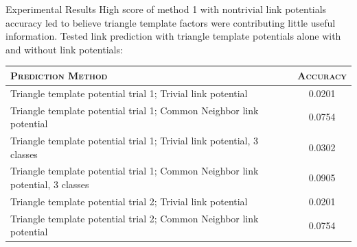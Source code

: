 \message{ !name(poster.tex)}\documentclass[final,t]{beamer}
\begin{document}
\begin{frame}{}
\begin{columns}[t]
\begin{column}{.3\linewidth}
\begin{block}{Experimental Results}
High score of  method 1 with nontrivial link potentials accuracy led to believe \alert{triangle template
factors were contributing little useful information}.
\break
\break
Tested link prediction with triangle template potentials alone with
and without link potentials:
\break
\begin{center}
\begin{tabular}{l|c}
\hline
\textsc{Prediction Method} & \textsc{Accuracy} \\
\hline
\hline
Triangle template potential trial 1; Trivial link potential & 0.0201
\\
Triangle template potential trial 1; Common Neighbor link potential & 0.0754                    %
\\
Triangle template potential trial 1; Trivial link potential, 3 classes & 0.0302                                                  %
\\
Triangle template potential trial 1; Common Neighbor link potential, 3 classes & 0.0905     %
\\
Triangle template potential trial 2; Trivial link potential & 0.0201
\\
Triangle template potential trial 2; Common Neighbor link potential & 0.0754
\\
\hline
\end{tabular}
\end{center}

\break
      \end{block}
                
\end{column}
\end{columns}
\end{frame}
\end{document}
